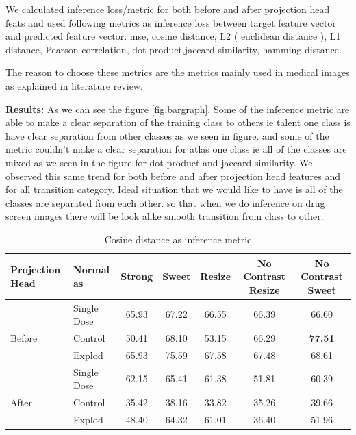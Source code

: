 We calculated inference loss/metric for both  before and after projection head feats and used following metrics as inference loss between target feature vector and predicted feature vector: mse, cosine distance, L2 ( euclidean distance ), L1 distance, Pearson correlation, dot product,jaccard similarity, hamming distance.

The reason to choose these metrics are the metrics mainly used in medical images as explained in literature review.

\textbf{Results:}
 As we can see the figure \ref{fig:bargraph}. Some of the inference metric are able to make a clear separation of the training class to others ie talent one class is have clear separation from other classes as we seen in figure. and some of the metric couldn't make a clear separation for atlas one class ie all of the classes are mixed as we seen in the figure for dot product and jaccard similarity. We observed this same trend  for both before and after projection head features and for all transition category. Ideal situation that we would like to have is all of the classes are separated from each other. so that when we do inference on drug screen images there will be look alike smooth transition from class to other.

\begin{table}[H]
  \centering
  \begin{tabular}{@{}llccccc@{}}
  \toprule
  Projection Head & Normal as       & Strong & Sweet & Resize & No Contrast Resize & No Contrast Sweet \\ \midrule
                  & Single Dose    & 65.93      & 67.22     & 66.55      & 66.39                  & 66.60                 \\
  Before          & Control        & 50.41      & 68.10     & 53.15      & 66.29                  & \textbf{77.51}                 \\
                  & Explod         & 65.93      & 75.59     & 67.58      & 67.48                  & 68.61                 \\ \midrule
                  & Single Dose    & 62.15      & 65.41     & 61.38      & 51.81                  & 60.39                 \\
  After           & Control        & 35.42      & 38.16    & 33.82      & 35.26                  & 39.66                 \\
                  & Explod         & 48.40      & 64.32     & 61.01      & 36.40                  & 51.96                 \\ \bottomrule
  \end{tabular}
  \caption{Cosine distance as inference metric}
  \label{tab:table_cosine}
\end{table}

